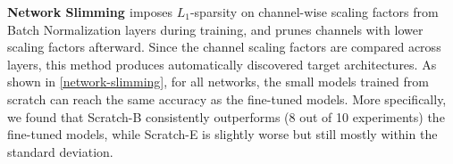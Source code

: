 \textbf{Network Slimming \citep{liu2017learning}}
 imposes $L_1$-sparsity on channel-wise scaling factors from Batch Normalization layers \citep{bn} during training, and prunes channels with lower scaling factors afterward. Since the channel scaling factors are compared across layers, this method produces automatically discovered target architectures. As shown in \autoref{network-slimming}, for all networks, the small models trained from scratch can reach the same accuracy as the fine-tuned models. More specifically, we found that Scratch-B consistently outperforms (8 out of 10 experiments) the fine-tuned models, while Scratch-E is slightly worse but still mostly within the standard deviation.
 
 \setlength{\tabcolsep}{5pt}
\renewcommand{\arraystretch}{1.2}
\begin{table}[!htbp]
\small
\centering
{}
\end{table}
